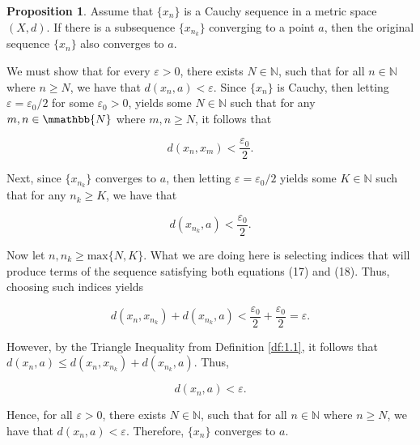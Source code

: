 \documentclass{article}
\makeatletter
\theoremstyle{definition}
\newtheorem{prop}{Proposition}[section]
\theoremstyle{remark}
\let\oldproofname=\proofname
\renewcommand{\proofname}{\bf{\textit{\oldproofname}}}
\theoremstyle{definition}
\renewenvironment{proof}[1][\proofname]{\par
  \pushQED{\qed}%
  \normalfont \topsep6\p@\@plus6\p@\relax
  \list{}{\leftmargin=0mm
          \rightmargin=0mm
          \settowidth{\itemindent}{\itshape#1}%
          \labelwidth=\itemindent
          \parsep=0pt \listparindent=0mm%
  }
  \item[\hskip\labelsep
        \itshape
    #1\@addpunct{.}]\ignorespaces
}{%
  \popQED\endlist\@endpefalse
}
\makeatother
\begin{document}
\begin{prop}\label{prop:2.2}
    Assume that $\{x_n\}$ is a Cauchy sequence in a metric space $(X,d)$. If there is a subsequence $\{x_{n_k}\}$ converging to a point $a$, then the original sequence $\{x_n\}$ also converges to $a$.
\end{prop}

\begin{proof}
    We must show that for every $\varepsilon>0$, there exists $N\in\mathbb{N}$, such that for all $n\in\mathbb{N}$ where $n\geq N$, we have that $d(x_n, a)<\varepsilon$. Since $\{x_n\}$ is Cauchy, then letting $\varepsilon=\varepsilon_0/2$ for some $\varepsilon_0>0$, yields some $N\in\mathbb{N}$ such that for any $m,n\in\mmathbb{N}$ where $m,n\geq N$, it follows that 
    
    \begin{equation}
        d(x_n,x_m)<\frac{\varepsilon_0}{2}.
    \end{equation}
    
    Next, since $\{x_{n_k}\}$ converges to $a$, then letting $\varepsilon=\varepsilon_0/2$ yields some $K\in\mathbb{N}$ such that for any $n_k\geq K$, we have that 
    
    \begin{equation}
        d(x_{n_k},a)<\frac{\varepsilon_0}{2}.
    \end{equation}
    
    Now let $n,n_k\geq\text{max}\{N,K\}$. What we are doing here is selecting indices that will produce terms of the sequence satisfying both equations (17) and (18). Thus, choosing such indices yields
    
    \begin{equation}
        d(x_n,x_{n_k})+d(x_{n_k},a)<\frac{\varepsilon_0}{2}+\frac{\varepsilon_0}{2}=\varepsilon.
    \end{equation}
    
    However, by the Triangle Inequality from Definition \ref{df:1.1}, it follows that $d(x_n,a)\leq d(x_n,x_{n_k})+d(x_{n_k},a)$. Thus, 
    
    \begin{equation*}
        d(x_n,a)<\varepsilon.
    \end{equation*}
    
    Hence, for all $\varepsilon>0$, there exists $N\in\mathbb{N}$, such that for all $n\in\mathbb{N}$ where $n\geq N$, we have that $d(x_n,a)<\varepsilon$. Therefore, $\{x_n\}$ converges to $a$.
\end{proof}
\end{document}

